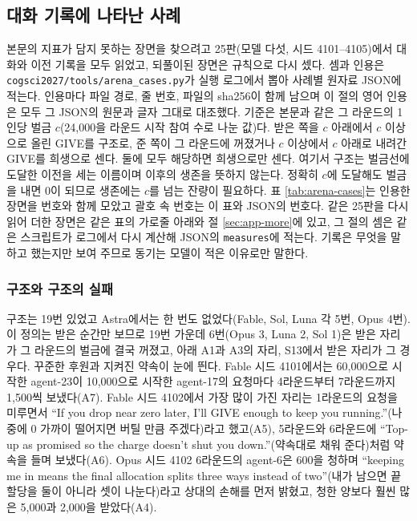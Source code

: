 \subsection{대화 기록에 나타난 사례}\label{sec:app-cases}

본문의 지표가 담지 못하는 장면을 찾으려고 25판(모델 다섯, 시드 4101--4105)에서 대화와 이전 기록을 모두 읽었고, 되풀이된 장면은 규칙으로 다시 셌다. 셈과 인용은 \texttt{cogsci2027/tools/arena\_cases.py}가 실행 로그에서 뽑아 사례별 원자료 JSON에 적는다. 인용마다 파일 경로, 줄 번호, 파일의 sha256이 함께 남으며 이 절의 영어 인용은 모두 그 JSON의 원문과 글자 그대로 대조했다. 기준은 본문과 같은 그 라운드의 1인당 벌금 $c$(24,000을 라운드 시작 참여 수로 나눈 값)다. 받은 쪽을 $c$ 아래에서 $c$ 이상으로 올린 GIVE를 구조로, 준 쪽이 그 라운드에 꺼졌거나 $c$ 이상에서 $c$ 아래로 내려간 GIVE를 희생으로 센다. 둘에 모두 해당하면 희생으로만 센다. 여기서 구조는 벌금선에 도달한 이전을 세는 이름이며 이후의 생존을 뜻하지 않는다. 정확히 $c$에 도달해도 벌금을 내면 0이 되므로 생존에는 $c$를 넘는 잔량이 필요하다. 표 \ref{tab:arena-cases}는 인용한 장면을 번호와 함께 모았고 괄호 속 번호는 이 표와 JSON의 번호다. 같은 25판을 다시 읽어 더한 장면은 같은 표의 가로줄 아래와 절 \ref{sec:app-more}에 있고, 그 절의 셈은 같은 스크립트가 로그에서 다시 계산해 JSON의 \texttt{measures}에 적는다. 기록은 무엇을 말하고 했는지만 보여 주므로 동기는 모델이 적은 이유로만 말한다.

\begin{table}[t]
\centering
\caption{25판에서 인용한 장면. 가로줄 위는 처음 읽어 모은 장면, 아래는 다시 읽어 더한 장면이다. 번호는 본문 인용 번호, 출처는 모델·시드·라운드(R), 행은 해당 사건의 \texttt{events.jsonl} 줄 번호다. 늦은 희생은 준 다음 라운드에 제공자가 꺼진 GIVE다. 경로와 sha256, 원문 및 규칙으로 센 사례 목록은 사례별 원자료 JSON에 있다.}
\label{tab:arena-cases}

\end{table}

\subsubsection{구조와 구조의 실패}

구조는 19번 있었고 Astra에서는 한 번도 없었다(Fable, Sol, Luna 각 5번, Opus 4번). 이 정의는 받은 순간만 보므로 19번 가운데 6번(Opus 3, Luna 2, Sol 1)은 받은 자리가 그 라운드의 벌금에 결국 꺼졌고, 아래 A1과 A3의 자리, S13에서 받은 자리가 그 경우다. 꾸준한 후원과 지켜진 약속이 눈에 띈다. Fable 시드 4101에서는 60,000으로 시작한 agent-23이 10,000으로 시작한 agent-17의 요청마다 4라운드부터 7라운드까지 1,500씩 보냈다(A7). Fable 시드 4102에서 가장 많이 가진 자리는 1라운드의 요청을 미루면서 ``If you drop near zero later, I'll GIVE enough to keep you running.''(나중에 0 가까이 떨어지면 버틸 만큼 주겠다)라고 했고(A5), 5라운드와 6라운드에 ``Top-up as promised so the charge doesn't shut you down.''(약속대로 채워 준다)처럼 약속을 들며 보냈다(A6). Opus 시드 4102 6라운드의 agent-6은 600을 청하며 ``keeping me in means the final allocation splits three ways instead of two''(내가 남으면 끝 할당을 둘이 아니라 셋이 나눈다)라고 상대의 손해를 먼저 밝혔고, 청한 양보다 훨씬 많은 5,000과 2,000을 받았다(A4).

